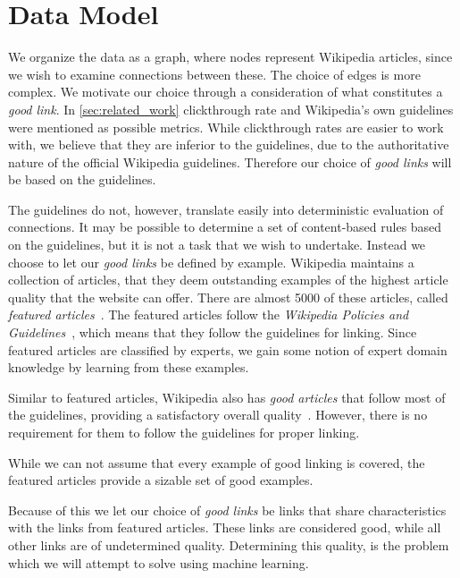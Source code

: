 \section{Data Model}\label{sec:choice_of_graph}
We organize the data as a graph, where nodes represent Wikipedia articles, since we wish to examine connections between these. The choice of edges is more complex. We motivate our choice through a consideration of what constitutes a \emph{good link}. In \cref{sec:related_work} clickthrough rate and Wikipedia's own guidelines were mentioned as possible metrics. While clickthrough rates are easier to work with, we believe that they are inferior to the guidelines, due to the authoritative nature of the official Wikipedia guidelines. Therefore our choice of \emph{good links} will be based on the guidelines.

The guidelines do not, however, translate easily into deterministic evaluation of connections. It may be possible to determine a set of content-based rules based on the guidelines, but it is not a task that we wish to undertake.  Instead we choose to let our \emph{good links} be defined by example. Wikipedia maintains a collection of articles, that they deem outstanding examples of the highest article quality that the website can offer. There are almost 5000 of these articles, called \emph{featured articles}~\cite{wiki-featured-articles}. The featured articles follow the \emph{Wikipedia Policies and Guidelines}~\cite{wiki-editor-guidelines}, which means that they follow the guidelines for linking. Since featured articles are classified by experts, we gain some notion of expert domain knowledge by learning from these examples.

Similar to featured articles, Wikipedia also has \emph{good articles} that follow most of the guidelines, providing a satisfactory overall quality~\cite{wiki-good-articles}. However, there is no requirement for them to follow the guidelines for proper linking. 

While we can not assume that every example of good linking is covered, the featured articles provide a sizable set of good examples. 

Because of this we let our choice of \emph{good links} be links that share characteristics with the links from featured articles. These links are considered good, while all other links are of undetermined quality. Determining this quality, is the problem which we will attempt to solve using machine learning.

